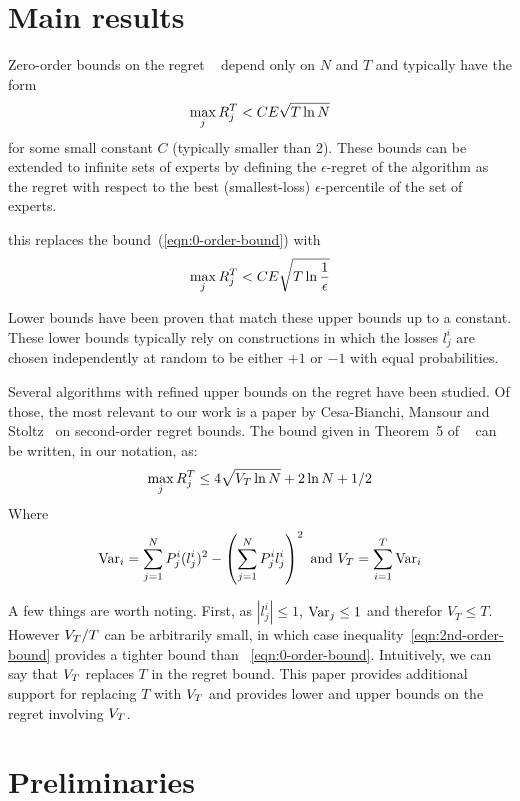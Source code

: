 \documentclass{article}[12pt]
\begin{document}
\section{Main results}
Zero-order bounds on the regret ~\cite{freund1999adaptive} depend only on $N$
and $T$ and typically have the form
\begin{equation} \label{eqn:0-order-bound}
  \max_j R_j^T < C E \sqrt{T \ln N}
\end{equation}
for some small constant $C$ (typically smaller than 2).
These bounds can be extended to infinite sets of experts by defining
the $\epsilon$-regret of the algorithm as the regret with respect to
the best (smallest-loss) $\epsilon$-percentile of the set of experts.

this replaces the bound~(\ref{eqn:0-order-bound}) with 
\begin{equation} \label{eqn:0-epsilon-order-bound}
  \max_j R_j^T < C E \sqrt{T \ln \frac{1}{\epsilon}}
\end{equation}

Lower bounds have been proven that match these upper bounds up to a
constant. These lower bounds typically rely on constructions in which
the losses $l_j^i$ are chosen independently at random to be either
$+1$ or $-1$ with equal probabilities.



Several algorithms with refined upper bounds on the regret have been
studied. Of those, the most relevant to our work is a paper by 
Cesa-Bianchi, Mansour and
Stoltz~\cite{cesa2007improved} on second-order regret bounds.
The bound given in Theorem~5 of ~\cite{cesa2007improved} can be
written, in our notation, as:
\begin{equation} \label{eqn:2nd-order-bound}
  \max_j R_j^T \leq 4\sqrt{V_T \ln N} +2 \ln N +1/2 
\end{equation}
Where
\[
  \mbox{Var}_i = \sum_{j=1}^N P^i_j (l_j^i)^2 -  \left( \sum_{j=1}^N P^i_j
    l_j^i \right)^2 \mbox{ and } V_T= \sum_{i=1}^T \mbox{Var}_i
\]

A few things are worth noting. First, as $|l_j^i|\leq 1$,
$\mbox{Var}_j\leq 1$ and therefor $V_T\leq T$. However $V_T/T$ can be
arbitrarily small, in which case inequality~\ref{eqn:2nd-order-bound}
provides a tighter bound than ~\ref{eqn:0-order-bound}. Intuitively,
we can say that $V_T$ replaces $T$ in the regret bound. This paper
provides additional support for replacing $T$ with $V_T$ and provides
lower and upper bounds on the regret involving $V_T$.

\section{Preliminaries} \label{sec:preliminaries}
\end{document}

